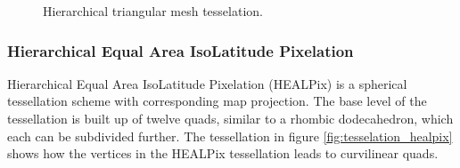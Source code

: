\begin{figure}
\begin{subfigure}[b]{0.2\textwidth}
    \end{subfigure}
    \caption{Hierarchical triangular mesh tesselation.}
    \label{fig:tesselation_htm}
\end{figure}

\subsubsection{Hierarchical Equal Area IsoLatitude Pixelation}

Hierarchical Equal Area IsoLatitude Pixelation (HEALPix) is a spherical tessellation scheme with corresponding map projection. The base level of the tessellation is built up of twelve quads, similar to a rhombic dodecahedron, which each can be subdivided further. The tessellation in figure \ref{fig:tesselation_healpix} shows how the vertices in the HEALPix tessellation leads to curvilinear quads.

